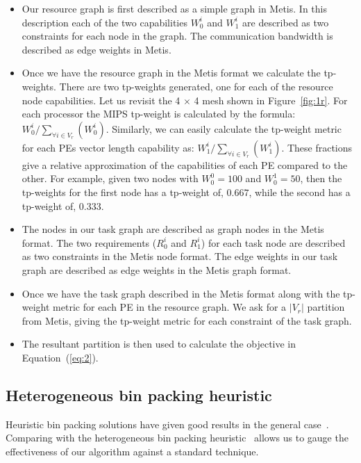 \begin{itemize}

\item Our resource graph is first described as a simple graph in
  Metis. In this description each of the two capabilities $W^i_0$ and
  $W^i_1$ are described as two constraints for each node in the
  graph. The communication bandwidth is described as edge weights in
  Metis.

\item Once we have the resource graph in the Metis format we calculate
  the tp-weights. There are two tp-weights generated, one for each of
  the resource node capabilities. Let us revisit the 4 $\times$ 4 mesh
  shown in Figure~\ref{fig:1r}. For each processor the MIPS tp-weight is
  calculated by the formula: $W^i_0/\sum_{\forall i \in
    V_r}(W^i_0)$. Similarly, we can easily calculate the tp-weight
  metric for each PEs vector length capability as: $W^i_1/\sum_{\forall
    i \in V_r}(W^i_1)$. These fractions give a relative approximation of
  the capabilities of each PE compared to the other. For example, given
  two nodes with $W^0_0 = 100$ and $W^1_0 = 50$, then the tp-weights for
  the first node has a tp-weight of, $0.667$, while the second has a
  tp-weight of, $0.333$.

\item The nodes in our task graph are described as graph nodes in the
  Metis format. The two requirements ($R^i_0$ and $R^i_1$) for each task
  node are described as two constraints in the Metis node format. The
  edge weights in our task graph are described as edge weights in the
  Metis graph format.

\item Once we have the task graph described in the Metis format along
  with the tp-weight metric for each PE in the resource graph. We ask
  for a $|V_r|$ partition from Metis, giving the tp-weight metric for
  each constraint of the task graph.

\item The resultant partition is then used to calculate the objective in
  Equation~(\ref{eq:2}).

\end{itemize}

\subsection{Heterogeneous bin packing heuristic}
\label{sec:heter-bin-pack}

Heuristic bin packing solutions have given good results in the general
case~\cite{ecof78}. Comparing with the heterogeneous bin packing
heuristic~\cite{mmar11} allows us to gauge the effectiveness of our
algorithm against a standard technique.

